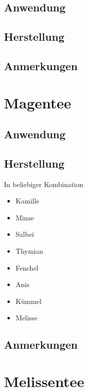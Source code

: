   

\subsection{Anwendung}

\subsection{Herstellung}

\subsection{Anmerkungen}



\newpage


\section{Magentee}

  

\subsection{Anwendung}

\subsection{Herstellung}

In beliebiger Kombination

\begin{itemize}
	\item Kamille
	\item Minze
	\item Salbei
	\item Thymian
	\item Fenchel
	\item Anis
	\item Kümmel
	\item Melisse
\end{itemize}

\subsection{Anmerkungen}


\newpage


\section{Melissentee}

